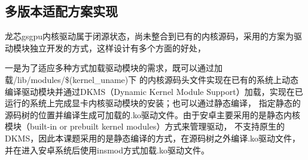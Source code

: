 
\subsection{多版本适配方案实现}
龙芯gsgpu内核驱动属于闭源状态，尚未整合到已有的内核源码，采用的方案为驱动模块独立开发的方式，这样设计有多个方面的好处，

一是为了适应多种方式加载驱动模块的需求，既可以通过加载/lib/modules/\$(kernel\_uname)下
的内核源码头文件实现在已有的系统上动态编译驱动模块并通过DKMS（Dynamic Kernel Module Support）加载，实现在已运行的系统上完成显卡内核驱动模块的安装；也可以通过静态编译，
指定静态的源码树的位置并编译生成可加载的.ko驱动文件。由于安卓主要采用的是静态内核模块（built-in or prebuilt kernel modules）方式来管理驱动，
不支持原生的DKMS，因此本课题采用的是静态编译的方式，在源码树之外编译.ko驱动文件，并在进入安卓系统后使用insmod方式加载.ko驱动文件。

